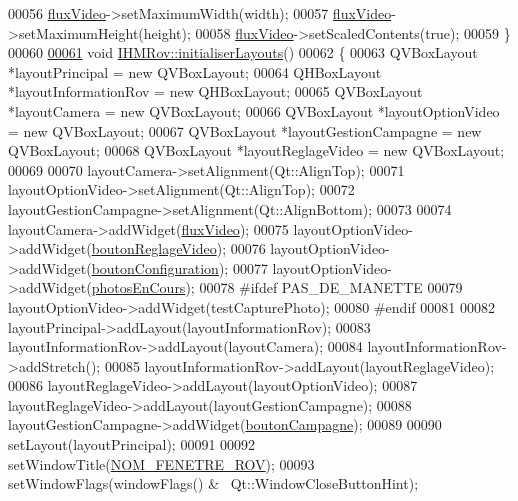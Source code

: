\begin{DoxyCode}
00056     \hyperlink{class_i_h_m_rov_acdeabe02e1431b5c1817cb2a89debd0a}{fluxVideo}->setMaximumWidth(width);
00057     \hyperlink{class_i_h_m_rov_acdeabe02e1431b5c1817cb2a89debd0a}{fluxVideo}->setMaximumHeight(height);
00058     \hyperlink{class_i_h_m_rov_acdeabe02e1431b5c1817cb2a89debd0a}{fluxVideo}->setScaledContents(\textcolor{keyword}{true});
00059 \}
00060 
\hyperlink{class_i_h_m_rov_aa900473297415bf43a13c4152034135a}{00061} \textcolor{keywordtype}{void} \hyperlink{class_i_h_m_rov_aa900473297415bf43a13c4152034135a}{IHMRov::initialiserLayouts}()
00062 \{
00063     QVBoxLayout *layoutPrincipal = \textcolor{keyword}{new} QVBoxLayout;
00064     QHBoxLayout *layoutInformationRov = \textcolor{keyword}{new} QHBoxLayout;
00065     QVBoxLayout *layoutCamera = \textcolor{keyword}{new} QVBoxLayout;
00066     QVBoxLayout *layoutOptionVideo = \textcolor{keyword}{new} QVBoxLayout;
00067     QVBoxLayout *layoutGestionCampagne = \textcolor{keyword}{new} QVBoxLayout;
00068     QVBoxLayout *layoutReglageVideo = \textcolor{keyword}{new} QVBoxLayout;
00069 
00070     layoutCamera->setAlignment(Qt::AlignTop);
00071     layoutOptionVideo->setAlignment(Qt::AlignTop);
00072     layoutGestionCampagne->setAlignment(Qt::AlignBottom);
00073 
00074     layoutCamera->addWidget(\hyperlink{class_i_h_m_rov_acdeabe02e1431b5c1817cb2a89debd0a}{fluxVideo});
00075     layoutOptionVideo->addWidget(\hyperlink{class_i_h_m_rov_a57cb3bea4f1f9149d730ccc5688581fc}{boutonReglageVideo});
00076     layoutOptionVideo->addWidget(\hyperlink{class_i_h_m_rov_aea67721180bf155892a297b3c39309c5}{boutonConfiguration});
00077     layoutOptionVideo->addWidget(\hyperlink{class_i_h_m_rov_a0896dea1a2d901a7cf43a344e22fc66d}{photosEnCours});
00078 \textcolor{preprocessor}{    #ifdef PAS\_DE\_MANETTE}
00079     layoutOptionVideo->addWidget(testCapturePhoto);
00080 \textcolor{preprocessor}{    #endif}
00081 
00082     layoutPrincipal->addLayout(layoutInformationRov);
00083     layoutInformationRov->addLayout(layoutCamera);
00084     layoutInformationRov->addStretch();
00085     layoutInformationRov->addLayout(layoutReglageVideo);
00086     layoutReglageVideo->addLayout(layoutOptionVideo);
00087     layoutReglageVideo->addLayout(layoutGestionCampagne);
00088     layoutGestionCampagne->addWidget(\hyperlink{class_i_h_m_rov_a324be23537f48127c49b943aa439a978}{boutonCampagne});
00089 
00090     setLayout(layoutPrincipal);
00091 
00092     setWindowTitle(\hyperlink{ihmrov_8h_aa7e4fcf0d5f67b5c84de425d1f4776ea}{NOM\_FENETRE\_ROV});
00093     setWindowFlags(windowFlags() & ~Qt::WindowCloseButtonHint);

\end{DoxyCode}
